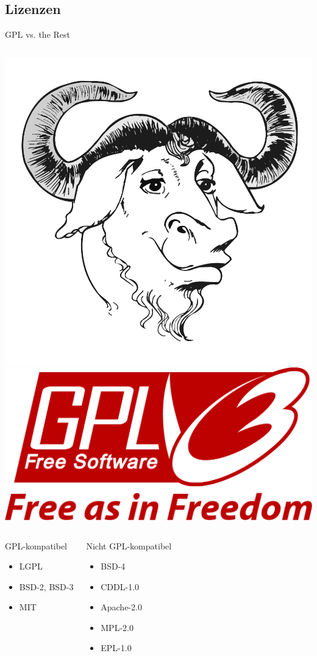 \documentclass[pdflatex, ngerman, handout]{beamer}
\begin{document}
\subsection*{Lizenzen}

\begin{frame}{GPL vs. the Rest}
\begin{columns}
\centering\includegraphics[width=0.5\columnwidth]{Official_gnu}
\centering\includegraphics[width=0.5\columnwidth]{GPLv3_Logo}
\end{columns}
\begin{columns}
\begin{block}{GPL-kompatibel}
  \begin{itemize}
    \item LGPL
    \item BSD-2, BSD-3
    \item MIT
  \end{itemize}
\end{block}
\begin{block}{Nicht GPL-kompatibel}
  \begin{itemize}
    \item BSD-4
    \item CDDL-1.0
    \item Apache-2.0
    \item MPL-2.0
    \item EPL-1.0
  \end{itemize}
\end{block}
\end{columns}
\end{frame}
\end{document}
